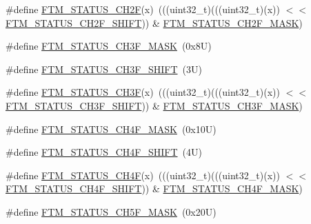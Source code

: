 \begin{DoxyCompactItemize}
\item 
\#define \mbox{\hyperlink{group___f_t_m___register___masks_ga0eea044d1ce2b4cf6a7a202f00ae6afd}{F\+T\+M\+\_\+\+S\+T\+A\+T\+U\+S\+\_\+\+C\+H2F}}(x)~(((uint32\+\_\+t)(((uint32\+\_\+t)(x)) $<$$<$ \mbox{\hyperlink{group___f_t_m___register___masks_ga94df65cce2bfdcf540b7870192e1e5ae}{F\+T\+M\+\_\+\+S\+T\+A\+T\+U\+S\+\_\+\+C\+H2\+F\+\_\+\+S\+H\+I\+FT}})) \& \mbox{\hyperlink{group___f_t_m___register___masks_gab75f4d4d1939e42385d1feb59b1eb363}{F\+T\+M\+\_\+\+S\+T\+A\+T\+U\+S\+\_\+\+C\+H2\+F\+\_\+\+M\+A\+SK}})
\item 
\#define \mbox{\hyperlink{group___f_t_m___register___masks_ga01848bca7d5009780d57fb7ecdbdc70f}{F\+T\+M\+\_\+\+S\+T\+A\+T\+U\+S\+\_\+\+C\+H3\+F\+\_\+\+M\+A\+SK}}~(0x8\+U)
\item 
\#define \mbox{\hyperlink{group___f_t_m___register___masks_gac407f69b8388265201670d565e9f4164}{F\+T\+M\+\_\+\+S\+T\+A\+T\+U\+S\+\_\+\+C\+H3\+F\+\_\+\+S\+H\+I\+FT}}~(3\+U)
\item 
\#define \mbox{\hyperlink{group___f_t_m___register___masks_ga0aeb1d19fc5d86bf39b883bd7fd6c02f}{F\+T\+M\+\_\+\+S\+T\+A\+T\+U\+S\+\_\+\+C\+H3F}}(x)~(((uint32\+\_\+t)(((uint32\+\_\+t)(x)) $<$$<$ \mbox{\hyperlink{group___f_t_m___register___masks_gac407f69b8388265201670d565e9f4164}{F\+T\+M\+\_\+\+S\+T\+A\+T\+U\+S\+\_\+\+C\+H3\+F\+\_\+\+S\+H\+I\+FT}})) \& \mbox{\hyperlink{group___f_t_m___register___masks_ga01848bca7d5009780d57fb7ecdbdc70f}{F\+T\+M\+\_\+\+S\+T\+A\+T\+U\+S\+\_\+\+C\+H3\+F\+\_\+\+M\+A\+SK}})
\item 
\#define \mbox{\hyperlink{group___f_t_m___register___masks_gac446951cc555fbf040895c15baa5a748}{F\+T\+M\+\_\+\+S\+T\+A\+T\+U\+S\+\_\+\+C\+H4\+F\+\_\+\+M\+A\+SK}}~(0x10\+U)
\item 
\#define \mbox{\hyperlink{group___f_t_m___register___masks_ga07a64ef5825a5ae2bc35a0f5816ea652}{F\+T\+M\+\_\+\+S\+T\+A\+T\+U\+S\+\_\+\+C\+H4\+F\+\_\+\+S\+H\+I\+FT}}~(4\+U)
\item 
\#define \mbox{\hyperlink{group___f_t_m___register___masks_gaf1cbd34863ebfe47c877617acfd71611}{F\+T\+M\+\_\+\+S\+T\+A\+T\+U\+S\+\_\+\+C\+H4F}}(x)~(((uint32\+\_\+t)(((uint32\+\_\+t)(x)) $<$$<$ \mbox{\hyperlink{group___f_t_m___register___masks_ga07a64ef5825a5ae2bc35a0f5816ea652}{F\+T\+M\+\_\+\+S\+T\+A\+T\+U\+S\+\_\+\+C\+H4\+F\+\_\+\+S\+H\+I\+FT}})) \& \mbox{\hyperlink{group___f_t_m___register___masks_gac446951cc555fbf040895c15baa5a748}{F\+T\+M\+\_\+\+S\+T\+A\+T\+U\+S\+\_\+\+C\+H4\+F\+\_\+\+M\+A\+SK}})
\item 
\#define \mbox{\hyperlink{group___f_t_m___register___masks_ga5c12b3bd23aa6b86b73397ef3be611c4}{F\+T\+M\+\_\+\+S\+T\+A\+T\+U\+S\+\_\+\+C\+H5\+F\+\_\+\+M\+A\+SK}}~(0x20\+U)
$$
\end{DoxyCompactItemize}
